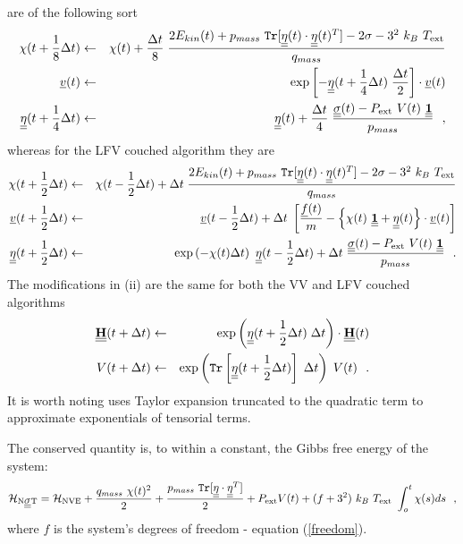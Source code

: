 are of the following sort
\begin{eqnarray}
\chi (t + {1 \over 8} \Delta t) &\leftarrow& \chi (t) + {\Delta t \over 8} \;
{{2 E_{kin}(t) + p_{mass}~{\tt Tr}[\mbox{$\underline{\underline{\bf \eta}}$}(t) \cdot
\mbox{$\underline{\underline{\bf \eta}}$}(t)^{T}] - 2 \sigma - 3^{2}~k_{B}~T_{\rm ext}} \over q_{mass}} \nonumber \\
\mbox{$\underline{v}$}(t) &\leftarrow& \exp \left[ - \mbox{$\underline{\underline{\bf \eta}}$}(t + {1 \over 4}\Delta t) \;
{\Delta t \over 2} \right] \cdot \mbox{$\underline{v}$}(t) \\
\mbox{$\underline{\underline{\bf \eta}}$}(t + {1 \over 4} \Delta t) &\leftarrow& \mbox{$\underline{\underline{\bf \eta}}$}(t) +
{\Delta t \over 4} \; \frac{\mbox{$\underline{\underline{\bf \sigma}}$}(t) - P_{\rm ext}~V(t)~\mbox{$\underline{\underline{\bf 1}}$}}{p_{mass}}~~, \nonumber
\end{eqnarray}
whereas for the LFV couched algorithm they are
\begin{eqnarray}
\chi (t + {1 \over 2} \Delta t) &\leftarrow& \chi (t - {1 \over 2} \Delta t) + \Delta t \;
{{2 E_{kin}(t) + p_{mass}~{\tt Tr}[\mbox{$\underline{\underline{\bf \eta}}$}(t) \cdot \mbox{$\underline{\underline{\bf \eta}}$}(t)^{T}] -
2 \sigma - 3^{2}~k_{B}~T_{\rm ext}} \over q_{mass}} \nonumber \\
\mbox{$\underline{v}$}(t + {1 \over 2} \Delta t) &\leftarrow& \mbox{$\underline{v}$}(t - {1 \over 2} \Delta t) + \Delta t \;
\left[{\mbox{$\underline{f}$}(t) \over m} - \left\{ \chi(t)~\mbox{$\underline{\underline{\bf 1}}$} +
\mbox{$\underline{\underline{\bf \eta}}$}(t) \right\} \cdot \mbox{$\underline{v}$}(t) \right] \\
\mbox{$\underline{\underline{\bf \eta}}$}(t + {1 \over 2} \Delta t) &\leftarrow& \exp \left( -\chi (t) \Delta t \right) ~ \mbox{$\underline{\underline{\bf \eta}}$}(t - {1 \over 2} \Delta t) + \Delta t \;
\frac{\mbox{$\underline{\underline{\bf \sigma}}$}(t) - P_{\rm ext}~ V(t)~\mbox{$\underline{\underline{\bf 1}}$}}{p_{mass}}~~. \nonumber
\end{eqnarray}
The modifications in (ii) are the same for both the VV and LFV
couched algorithms
\begin{eqnarray}
\mbox{$\underline{\underline{\bf H}}$}(t + \Delta t) &\leftarrow& \exp \left( \mbox{$\underline{\underline{\bf \eta}}$}(t + {1 \over 2} \Delta t) \;
\Delta t \right) \cdot \mbox{$\underline{\underline{\bf H}}$}(t) \nonumber \\
V(t + \Delta t) &\leftarrow& \exp \left({\tt Tr}
\left[ \mbox{$\underline{\underline{\bf \eta}}$}(t + {1 \over 2} \Delta t) \right] \; \Delta t \right) \; V(t)~~.
\end{eqnarray}
It is worth noting \D uses Taylor expansion truncated to the
quadratic term to approximate exponentials of tensorial terms.

The conserved quantity is, to within a constant, the Gibbs free energy
of the system:
\begin{equation}
{\cal H}_{\rm N\mbox{$\underline{\underline{\bf \sigma}}$}T} = {\cal H}_{\rm NVE} + {q_{mass}~\chi (t)^{2} \over 2} +
{p_{mass}~{\tt Tr}[\mbox{$\underline{\underline{\bf \eta}}$} \cdot \mbox{$\underline{\underline{\bf \eta}}$}^{T}] \over 2} + P_{\rm ext} V(t) +
(f+3^{2})~k_{B}~T_{\rm ext}~\int_o^t \chi (s) ds~~,
\end{equation}
where $f$ is the system's degrees of freedom - equation
(\ref{freedom}).

